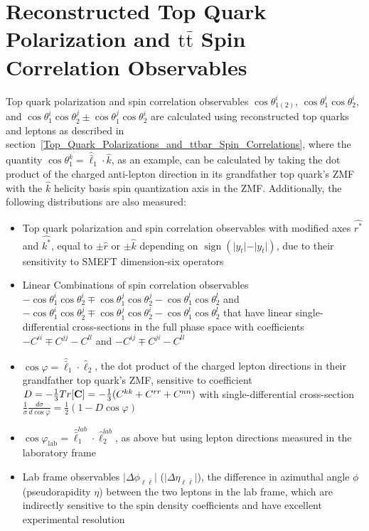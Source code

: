 \section{Reconstructed Top Quark Polarization and \ensuremath{\mathrm{t\bar{t}}} Spin Correlation Observables}
\label{Reconstructed_Polarization_Spin_Correlation_Observables}
Top quark polarization and \ttbar spin correlation observables $\cos\theta_{1(2)}^i$, $\cos \theta_1^i \cos \theta_2^i$, and $\cos \theta_1^i \cos \theta_2^j \pm \cos \theta_1^j \cos \theta_2^i$ are calculated using reconstructed top quarks and leptons as described in section~\ref{Top_Quark_Polarizations_and_ttbar_Spin_Correlations}, where the quantity $\cos \theta_1^k = \hat{\bar{\ell}}_1 \cdot \hat{k}$, as an example, can be calculated by taking the dot product of the charged anti-lepton direction in its grandfather top quark's ZMF with the $\hat{k}$ helicity basis spin quantization axis in the \ttbar ZMF.
Additionally, the following distributions are also measured:
\begin{itemize}
    \item Top quark polarization and \ttbar spin correlation observables with modified axes $\hat{r^*}$ and $\hat{k^*}$, equal to $\pm \hat{r}$ or $\pm \hat{k}$ depending on $\operatorname{sign}(\vert y_t \vert-\vert y_{\bar{t}} \vert)$, due to their sensitivity to SMEFT dimension-six operators
    \item Linear Combinations of spin correlation observables $-\cos \theta_1^i \cos \theta_2^i \mp \cos \theta_1^j \cos \theta_2^j - \cos \theta_1^l \cos \theta_2^l$ and $-\cos \theta_1^i \cos \theta_2^j \mp \cos \theta_1^j \cos \theta_2^i - \cos \theta_1^l \cos \theta_2^l$ that have linear single-differential cross-sections in the full phase space with coefficients $-C^{ii} \mp C^{jj} - C^{ll}$ and $-C^{ij} \mp C^{ji} - C^{ll}$
    \item  $\cos\varphi=\hat{\bar{\ell}}_{1} \cdot \hat{\ell}_2$, the dot product of the charged lepton directions in their grandfather top quark's ZMF, sensitive to coefficient $D = -\frac{1}{3}Tr[\mathbf{C}] = -\frac{1}{3}(C^{kk} + C^{rr} + C^{nn})$ with single-differential cross-section $\tfrac{1}{\sigma}\tfrac{d\sigma}{d\cos\varphi} = \tfrac{1}{2}(1-D\cos\varphi)$
    \item $\cos\varphi_{\mathrm{lab}}=\hat{\bar{\ell}}^{lab}_1 \cdot \hat{\ell}^{lab}_2$, as above but using lepton directions measured in the laboratory frame
    \item Lab frame observables $\vert \Delta\phi_{\ell\bar{\ell}} \vert$ ($\vert \Delta\eta_{\ell\bar{\ell}} \vert$), the difference in azimuthal angle $\phi$ (pseudorapidity $\eta$) between the two leptons in the lab frame, which are indirectly sensitive to the spin density coefficients and have excellent experimental resolution
\end{itemize}
